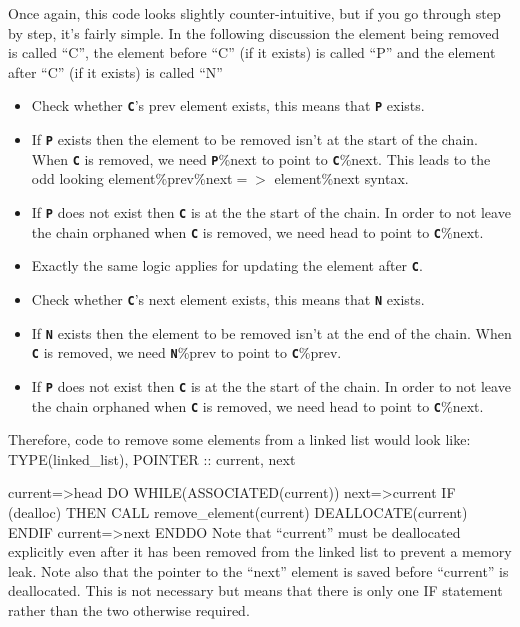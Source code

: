 \documentclass[12pt,a4paper]{article}
\newcommand{\inlinecode}[1]{{\color{warwickred} \bf\texttt{#1}}}
\newenvironment{boxverbatim}{\lboxverbatim{none}}{\endlboxverbatim}
\begin{document}
Once again, this code looks slightly counter-intuitive, but if you go through
step by step, it's fairly simple. In the following discussion the element
being removed is called ``C'', the element before ``C'' (if it exists) is
called ``P'' and the element after ``C'' (if it exists) is called ``N''
\begin{itemize}
\item Check whether \inlinecode{C}'s prev element exists, this means that
  \inlinecode{P} exists.
\item If \inlinecode{P} exists then the element to be removed isn't at the
  start of the chain. When \inlinecode{C} is removed, we need
  \inlinecode{P}\%next to point to \inlinecode{C}\%next. This leads to the odd
  looking element\%prev\%next$=>$ element\%next syntax.
\item If \inlinecode{P} does not exist then \inlinecode{C} is at the the start
  of the chain. In order to not leave the chain orphaned when \inlinecode{C}
  is removed, we need head to point to \inlinecode{C}\%next.
\item Exactly the same logic applies for updating the element after
  \inlinecode{C}.
\item Check whether \inlinecode{C}'s next element exists, this means that
  \inlinecode{N} exists.
\item If \inlinecode{N} exists then the element to be removed isn't at the end
  of the chain. When \inlinecode{C} is removed, we need \inlinecode{N}\%prev
  to point to \inlinecode{C}\%prev.
\item If \inlinecode{P} does not exist then \inlinecode{C} is at the the start
  of the chain. In order to not leave the chain orphaned when \inlinecode{C}
  is removed, we need head to point to \inlinecode{C}\%next.
\end{itemize}

Therefore, code to remove some elements from a linked list would look like:
\begin{boxverbatim}
TYPE(linked_list), POINTER :: current, next

current=>head
DO WHILE(ASSOCIATED(current))
  next=>current%
  IF (dealloc) THEN
    CALL remove_element(current)
    DEALLOCATE(current)
  ENDIF
  current=>next
ENDDO
\end{boxverbatim}
Note that ``current'' must be deallocated explicitly even after it has been
removed from the linked list to prevent a memory leak. Note also that the
pointer to the ``next'' element is saved before ``current'' is deallocated.
This is not necessary but means that there is only one IF statement rather
than the two otherwise required.
\end{document}
